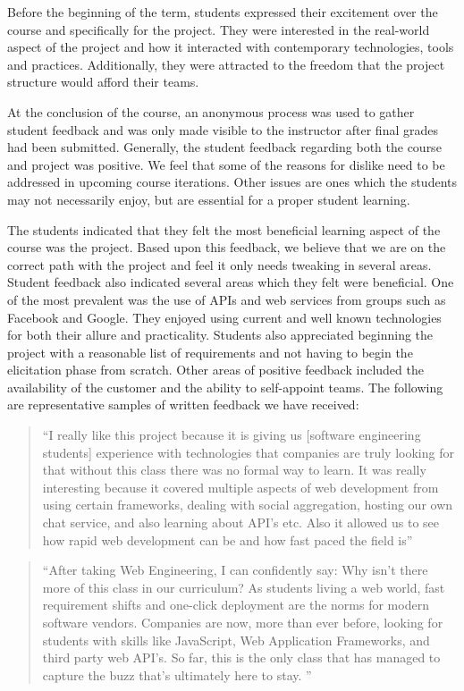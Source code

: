 \documentclass[conference]{IEEEtran}
\begin{document}
Before the beginning of the term, students expressed their excitement over the course and specifically for the project. They were interested in the real-world aspect of the project and how it interacted with contemporary technologies, tools and practices. Additionally, they were attracted to the freedom that the project structure would afford their teams.

At the conclusion of the course, an anonymous process was used to gather student feedback and was only made visible to the instructor after final grades had been submitted. Generally, the student feedback regarding both the course and project was positive. We feel that some of the reasons for dislike need to be addressed in upcoming course iterations. Other issues are ones which the students may not necessarily enjoy, but are essential for a proper student learning.


The students indicated that they felt the most beneficial learning aspect of the course was the project. Based upon this feedback, we believe that we are on the correct path with the project and feel it only needs tweaking in several areas. Student feedback also indicated several areas which they felt were beneficial. One of the most prevalent was the use of APIs and web services from groups such as Facebook and Google. They enjoyed using current and well known technologies for both their allure and practicality. Students also appreciated beginning the project with a reasonable list of requirements and not having to begin the elicitation phase from scratch. Other areas of positive feedback included the availability of the customer and the ability to self-appoint teams. The following are representative samples of written feedback we have received:

\begin{quotation}
“I really like this project because it is giving us [software engineering students] experience with technologies that companies are truly looking for that without this class there was no formal way to learn. It was really interesting because it covered multiple aspects of web development from using certain frameworks, dealing with social aggregation, hosting our own chat service, and also learning about API's etc. Also it allowed us to see how rapid web development can be and how fast paced the field is”
\end{quotation}

\begin{quotation}
“After taking Web Engineering, I can confidently say: Why isn't there more of this class in our curriculum? As students
living a web world, fast requirement shifts and one-click deployment are the norms for modern software vendors.
Companies are now, more than ever before, looking for students with skills like JavaScript, Web Application Frameworks, and third party web API's. So far, this is the only class that has managed to capture the buzz that's ultimately here to stay. ”
\end{quotation}
\end{document}
